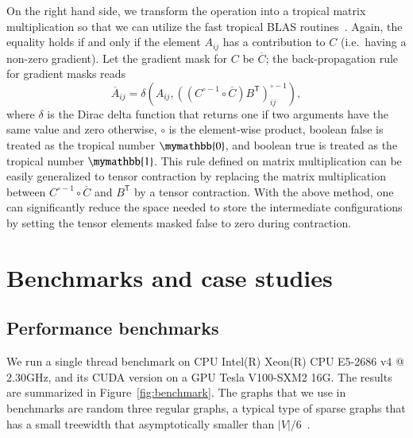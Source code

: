 \documentclass[onefignum, onetabnum]{siamart190516}
\newcommand{\<}{\langle}
\renewcommand{\>}{\rangle}
\begin{document}
On the right hand side, we transform the operation into a tropical matrix multiplication so that we can utilize the fast tropical BLAS routines~\cite{TropicalGEMM}.
Again, the equality holds if and only if the element $A_{ij}$ has a contribution to $C$ (i.e.\ having a non-zero gradient).
Let the gradient mask for $C$ be $\overline C$; the back-propagation rule for gradient masks reads
\begin{equation}\label{eq:adrule}
\overline{A}_{ij} = \delta \left(A_{ij}, \left( \left( C^{\circ-1} \circ \overline C \right) B^{\mathsf{T}} \right)_{ij}^{\circ -1} \right),
\end{equation}
where $\delta$ is the Dirac delta function that returns one if two arguments have the same value and zero otherwise, $\circ$ is the element-wise product, boolean false is treated as the tropical number $\mymathbb{0}$, and boolean true is treated as the tropical number $\mymathbb{1}$.
This rule defined on matrix multiplication can be easily generalized to tensor contraction by replacing the matrix multiplication between $C^{\circ-1} \circ \overline C$ and $B^{\mathsf{T}}$ by a tensor contraction.
With the above method, one can significantly reduce the space needed to store the intermediate configurations by setting the tensor elements masked false to zero during contraction.

\section{Benchmarks and case studies}\label{sec:benchmark}
\subsection{Performance benchmarks}
We run a single thread benchmark on CPU Intel(R) Xeon(R) CPU E5-2686 v4 @ 2.30GHz,
and its CUDA version on a GPU Tesla V100-SXM2 16G.
The results are summarized in Figure~\ref{fig:benchmark}.
The graphs that we use in benchmarks are random three regular graphs,
 a typical type of sparse graphs that has a small treewidth that asymptotically smaller than $|V|/6$~\cite{Fomin2006}.
\end{document}
